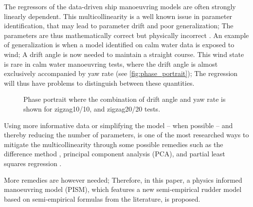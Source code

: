 %
The regressors of the data-driven ship manoeuvring models are often strongly linearly dependent. This multicollinearity is a well known issue in parameter identification, that may lead to parameter drift and poor generalization; The parameters are thus mathematically correct but physically incorrect \citep{luo_parameter_2016}. 
An example of generalization is when a model identified on calm water data is exposed to wind; A drift angle is now needed to maintain a straight course. This wind state is rare in calm water manoeuvring tests, where the drift angle is almost exclusively accompanied by yaw rate (see \autoref{fig:phase_portrait}); 
The regression will thus have problems to distinguish between these quantities.
%
\begin{figure}[h]
    \centering
    
    \caption{Phase portrait where the combination of drift angle and yaw rate is shown for zigzag10/10, and zigzag20/20 tests.}
    \label{fig:phase_portrait}
\end{figure}
Using more informative data or simplifying the model -- when possible -- and thereby reducing the number of parameters, is one of the most researched ways to mitigate the multicollinearity through some possible remedies such as the difference method \citep{luo_parameter_2016}, principal component analysis (PCA), and partial least squares regression \citep{jian-chuan_parametric_2015}. 

More remedies are however needed; Therefore, in this paper, a physics informed manoeuvring model (PISM), which features a new semi-empirical rudder model based on semi-empirical formulas from the literature, is proposed.

